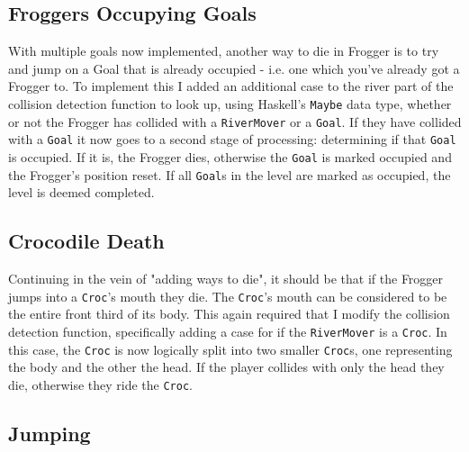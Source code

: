 \documentclass[12pt, a4paper]{report}
\begin{document}
\subsection{Froggers Occupying Goals}

With multiple goals now implemented, another way to die in Frogger is to try and jump on a Goal that is already occupied - i.e. one which you've already got a Frogger to.
To implement this I added an additional case to the river part of the collision detection function to look up, using Haskell's \verb|Maybe| data type, whether or not the Frogger has collided with a \verb|RiverMover| or a \verb|Goal|.
If they have collided with a \verb|Goal| it now goes to a second stage of processing: determining if that \verb|Goal| is occupied.
If it is, the Frogger dies, otherwise the \verb|Goal| is marked occupied and the Frogger's position reset.
If all \verb|Goal|s in the level are marked as occupied, the level is deemed completed.

\subsection{Crocodile Death}

Continuing in the vein of "adding ways to die", it should be that if the Frogger jumps into a \verb|Croc|'s mouth they die.
The \verb|Croc|'s mouth can be considered to be the entire front third of its body.
This again required that I modify the collision detection function, specifically adding a case for if the \verb|RiverMover| is a \verb|Croc|.
In this case, the \verb|Croc| is now logically split into two smaller \verb|Croc|s, one representing the body and the other the head.
If the player collides with only the head they die, otherwise they ride the \verb|Croc|.

\subsection{Jumping}
\end{document}
